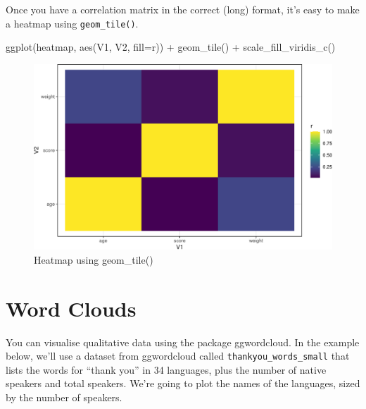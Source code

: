 \documentclass[
  oneside]{book}
\newenvironment{Shaded}{\begin{snugshade}}{\end{snugshade}}
\newcommand{\AttributeTok}[1]{\textcolor[rgb]{0.77,0.63,0.00}{#1}}
\newcommand{\FunctionTok}[1]{\textcolor[rgb]{0.00,0.00,0.00}{#1}}
\newcommand{\NormalTok}[1]{#1}
\newcommand{\SpecialCharTok}[1]{\textcolor[rgb]{0.00,0.00,0.00}{#1}}
\begin{document}
Once you have a correlation matrix in the correct (long) format, it's easy to make a heatmap using \texttt{geom\_tile()}.

\begin{Shaded}
\begin{Highlighting}[]
\FunctionTok{ggplot}\NormalTok{(heatmap, }\FunctionTok{aes}\NormalTok{(V1, V2, }\AttributeTok{fill=}\NormalTok{r)) }\SpecialCharTok{+}
  \FunctionTok{geom\_tile}\NormalTok{() }\SpecialCharTok{+}
  \FunctionTok{scale\_fill\_viridis\_c}\NormalTok{()}
\end{Highlighting}
\end{Shaded}

\begin{figure}

{\centering \includegraphics[width=0.9\linewidth]{images/heatmap-1} 

}

\caption{Heatmap using geom_tile()}\label{fig:heatmap}
\end{figure}

\hypertarget{word-clouds}{%
\section{Word Clouds}\label{word-clouds}}

You can visualise qualitative data using the package ggwordcloud. In the example below, we'll use a dataset from ggwordcloud called \texttt{thankyou\_words\_small} that lists the words for ``thank you'' in 34 languages, plus the number of native speakers and total speakers. We're going to plot the names of the languages, sized by the number of speakers.
\end{document}
